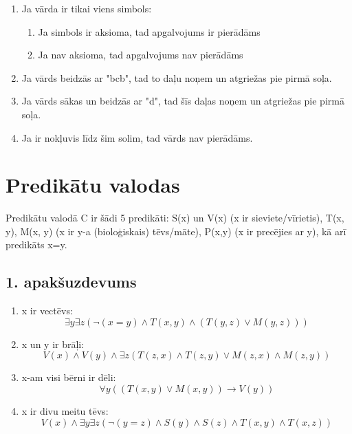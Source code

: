 \documentclass{article}
\begin{document}
\begin{enumerate}
    \item Ja vārda ir tikai viens simbols:
          \begin{enumerate}
              \item Ja simbols ir aksioma, tad apgalvojums ir pierādāms
              \item Ja nav aksioma, tad apgalvojums nav pierādāms
          \end{enumerate}
    \item Ja vārds beidzās ar "bcb", tad to daļu noņem un atgriežas pie pirmā soļa.
    \item Ja vārds sākas un beidzās ar "d", tad šīs daļas noņem un atgriežas pie pirmā soļa.
    \item Ja ir nokļuvis līdz šim solim, tad vārds nav pierādāms.
\end{enumerate}

\pagebreak

\section{Predikātu valodas}

Predikātu valodā C ir šādi 5 predikāti: S(x) un V(x) (x ir sieviete/vīrietis), T(x, y), M(x, y)
(x ir y-a (bioloģiskais) tēvs/māte), P(x,y) (x ir precējies ar y), kā arī predikāts x=y.

\subsection*{1. apakšuzdevums}

\begin{enumerate}
    \item x ir vectēvs:
          \[
              \exists y \exists z (\neg (x = y) \land T(x, y) \land (T(y, z) \lor M(y,z)))
          \]

    \item x un y ir brāļi:
          \[
              V(x) \land V(y) \land \exists z (T(z, x) \land T(z, y) \lor M(z, x) \land M(z, y))
          \]

    \item x-am visi bērni ir dēli:
          \[
              \forall y ((T(x,y) \lor M(x, y)) \rightarrow V(y))
          \]

    \item x ir divu meitu tēvs:
          \[
              V(x) \land \exists y \exists z (\neg (y = z) \land S(y) \land S(z) \land T(x, y) \land T(x, z))
          \]
\end{enumerate}
\end{document}
